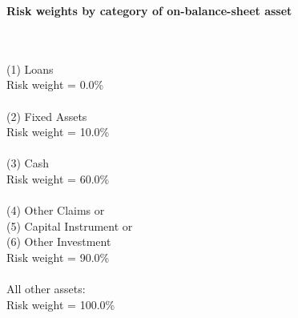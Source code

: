 \documentclass{article}
\begin{document}
\setlength{\parindent}{0em}
\begin{center}{\bf Risk weights by category of on-balance-sheet asset}\end{center}
~\\
~\\

(1) Loans\\
Risk weight = 0.0\%\\

~\\
(2) Fixed Assets\\
Risk weight = 10.0\%\\

~\\
(3) Cash \\
Risk weight = 60.0\%\\

~\\
(4) Other Claims or \\
(5) Capital Instrument or \\
(6) Other Investment \\
Risk weight = 90.0\%\\

~\\
All other assets:\\
Risk weight = 100.0\%\\

~\\
\end{document}
